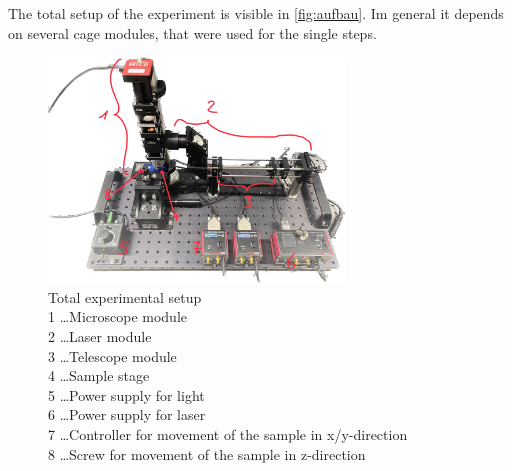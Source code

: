 \documentclass[12pt,english]{scrartcl}
\begin{document}
The total setup of the experiment is visible in \autoref{fig:aufbau}. Im
general it depends on several cage modules, that were used for the single
steps.

\begin{figure}[H]
	\begin{center}
		\includegraphics[width =0.7\textwidth]{./figures/aufbau.jpg}
	\end{center}
	\caption[Total experimental setup] { Total experimental setup                                       \\
		1 \dots Microscope module                                      \\
		2 \dots Laser module                                           \\
		3 \dots Telescope module                                       \\
		4 \dots Sample stage                                           \\
		5 \dots Power supply for light                                 \\
		6 \dots Power supply for laser                                 \\
		7 \dots Controller for movement of the sample in x/y-direction \\
		8 \dots Screw for movement of the sample in z-direction
	}\label{fig:aufbau}
\end{figure}
\end{document}
